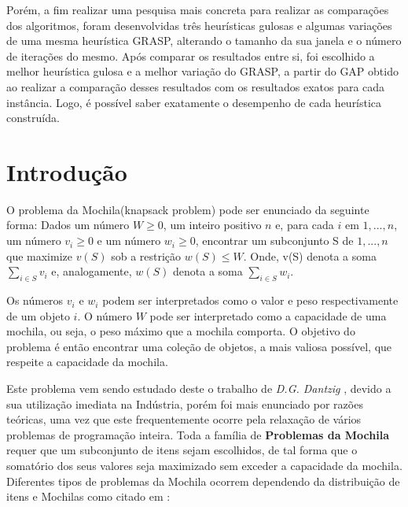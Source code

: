 \documentclass[a4paper, 12pt]{article}
\begin{document}
Porém, a fim realizar uma pesquisa mais concreta para realizar as comparações dos algoritmos,
foram desenvolvidas três heurísticas gulosas e algumas variações de uma mesma heurística GRASP, alterando
o tamanho da sua janela e o número de iterações do mesmo. Após comparar
os resultados entre si, foi escolhido a melhor heurística gulosa e a melhor variação do GRASP, a partir do GAP
obtido ao realizar a comparação desses resultados com os resultados exatos para cada instância. Logo, é possível saber
exatamente o desempenho de cada heurística construída.


\section{Introdução}

O problema da Mochila(knapsack problem) pode ser enunciado da seguinte forma:
Dados um número $W \geq 0$, um inteiro positivo $n$ e, para cada $i$ em ${1, . . . , n}$, um
número $v_i \geq 0$ e um número $w_i \geq 0$, encontrar um subconjunto S de ${1, . . . , n}$ que
maximize $v(S)$ sob a restrição $w(S)\leq W$. Onde, v(S) denota a soma $\sum_{ i \in S} v_i$ e, 
analogamente, $w(S)$ denota a soma $\sum_{ i \in S} w_i$.

Os números $v_i$ e $w_i$ podem ser interpretados como o valor e peso respectivamente
de um objeto $i$. O número $W$ pode ser interpretado como a capacidade de uma
mochila, ou seja, o peso máximo que a mochila comporta. O objetivo do problema
é então encontrar uma coleção de objetos, a mais valiosa possível, que respeite a
capacidade da mochila.

Este problema vem sendo estudado deste o trabalho de \textit{D.G. Dantzig} \cite{pisinger1995algorithms}, devido a
sua utilização imediata na Indústria, porém foi mais enunciado por razões teóricas, 
uma vez que este frequentemente ocorre pela relaxação de vários problemas de programação inteira. 
Toda a família de \textbf{Problemas da Mochila} requer que um subconjunto de itens sejam escolhidos, de tal forma que o
somatório dos seus valores seja maximizado sem exceder a capacidade da mochila.
Diferentes tipos de problemas da Mochila ocorrem dependendo da distribuição de
itens e Mochilas como citado em \cite{pisinger1995algorithms}:
\end{document}
